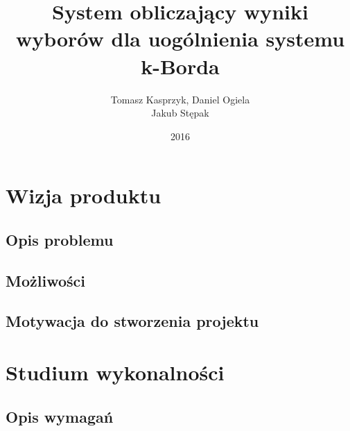 \documentclass[polish,12pt]{aghthesis}
\author{Tomasz Kasprzyk, Daniel Ogiela\\ Jakub Stępak}
\title{System obliczający wyniki wyborów dla uogólnienia systemu k-Borda}
\date{2016}
\begin{document}
\maketitle
\tableofcontents

\section{Wizja produktu}

\subsection{Opis problemu}

\subsection{Możliwości}

\subsection{Motywacja do stworzenia projektu}


\section{Studium wykonalności}
  
\subsection{Opis wymagań}





\nocite{artykul2011,ksiazka2011,narzedzie2011,projekt2011}


\end{document}
